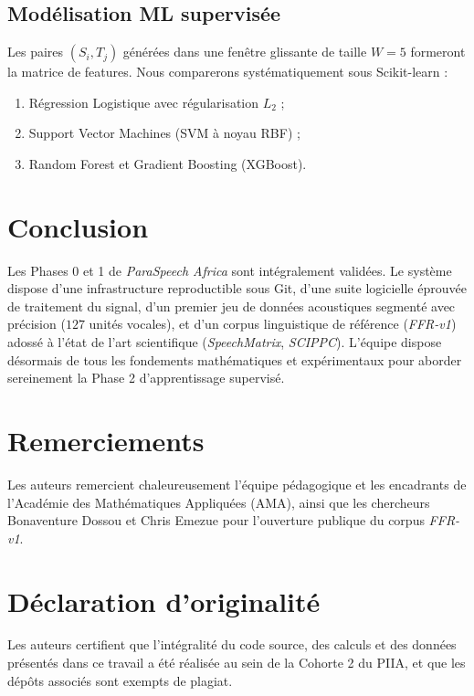 \documentclass[10pt,a4paper,twocolumn]{article}
\begin{document}
\subsection{Modélisation ML supervisée}
Les paires $(S_i, T_j)$ générées dans une fenêtre glissante de taille $W = 5$ formeront la matrice de features. Nous comparerons systématiquement sous Scikit-learn :
\begin{enumerate}
    \item Régression Logistique avec régularisation $L_2$ ;
    \item Support Vector Machines (SVM à noyau RBF) ;
    \item Random Forest et Gradient Boosting (XGBoost).
\end{enumerate}

\section{Conclusion}
Les Phases 0 et 1 de \textit{ParaSpeech Africa} sont intégralement validées. Le système dispose d'une infrastructure reproductible sous Git, d'une suite logicielle éprouvée de traitement du signal, d'un premier jeu de données acoustiques segmenté avec précision ($127$ unités vocales), et d'un corpus linguistique de référence (\textit{FFR-v1}) adossé à l'état de l'art scientifique (\textit{SpeechMatrix}, \textit{SCIPPC}). L'équipe dispose désormais de tous les fondements mathématiques et expérimentaux pour aborder sereinement la Phase 2 d'apprentissage supervisé.

\section*{Remerciements}
Les auteurs remercient chaleureusement l'équipe pédagogique et les encadrants de l'Académie des Mathématiques Appliquées (AMA), ainsi que les chercheurs Bonaventure Dossou et Chris Emezue pour l'ouverture publique du corpus \textit{FFR-v1}.

\section*{Déclaration d'originalité}
Les auteurs certifient que l'intégralité du code source, des calculs et des données présentés dans ce travail a été réalisée au sein de la Cohorte 2 du PIIA, et que les dépôts associés sont exempts de plagiat.
\end{document}
